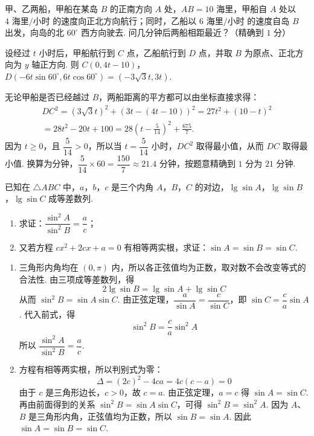 \begin{problem}
甲、乙两船，甲船在某岛 \(B\) 的正南方向 \(A\) 处，\(AB=10\text{ 海里}\)，甲船自 \(A\) 处以 \(4\text{ 海里/小时}\) 的速度向正北方向航行；同时，乙船以 \(6\text{ 海里/小时}\) 的速度自岛 \(B\) 出发，向岛的北 \(60^\circ\) 西方向驶去. 问几分钟后两船相距最近？（精确到 \(1\text{ 分}\)）
\end{problem}

\begin{solution}
设经过 \(t\) 小时后，甲船航行到 \(C\) 点，乙船航行到 \(D\) 点，并取 \(B\) 为原点、正北方向为 \(y\) 轴正方向. 则
\(C\left(0,4t-10\right)\)，\(D\left(-6t\sin60^\circ,6t\cos60^\circ\right)=\left(-3\sqrt3t,3t\right)\).


无论甲船是否已经越过 \(B\)，两船距离的平方都可以由坐标直接求得：
\[
\begin{gathered}
DC^2=\left(3\sqrt3t\right)^2+\left(3t-(4t-10)\right)^2
=27t^2+(10-t)^2\\
=28t^2-20t+100
=28\left(t-\frac5{14}\right)^2+\frac{675}{7}.
\end{gathered}
\]
因为 \(t\geq0\)，且 \(\dfrac5{14}>0\)，所以当 \(t=\dfrac5{14}\) 小时，\(DC^2\) 取得最小值，从而 \(DC\) 取得最小值. 换算为分钟，\(\dfrac5{14}\times60=\dfrac{150}{7}\approx21.4\) 分钟，按题意精确到 \(1\) 分为 \(21\) 分钟.
\end{solution}

\begin{problem}
已知在 \(\triangle ABC\) 中，\(a\)，\(b\)，\(c\) 是三个内角 \(A\)，\(B\)，\(C\) 的对边，\(\lg\sin A\)，\(\lg\sin B\)，\(\lg\sin C\) 成等差数列.
\begin{enumerate}
\item 求证：\(\dfrac{\sin^2 A}{\sin^2 B}=\dfrac{a}{c}\)；

\item 又若方程 \(cx^2+2cx+a=0\) 有相等两实根，求证：\(\sin A=\sin B=\sin C\).
\end{enumerate}
\end{problem}

\begin{solution}
\begin{enumerate}
\item 三角形内角均在 \(\left(0,\pi\right)\) 内，所以各正弦值均为正数，取对数不会改变等式的合法性. 由三项成等差数列，得
\[
2\lg\sin B=\lg\sin A+\lg\sin C
\]
从而 \(\sin^2B=\sin A\sin C\). 由正弦定理，\(\dfrac{a}{\sin A}=\dfrac{c}{\sin C}\)，即 \(\sin C=\dfrac{c}{a}\sin A\). 代入前式，得
\[
\sin^2B=\frac{c}{a}\sin^2A
\]
所以 \(\dfrac{\sin^2A}{\sin^2B}=\dfrac{a}{c}\).

\item 方程有相等两实根，所以判别式为零：
\[
\Delta=\left(2c\right)^2-4ca=4c\left(c-a\right)=0
\]
由于 \(c\) 是三角形边长，\(c>0\)，故 \(c=a\). 由正弦定理，\(a=c\) 得 \(\sin A=\sin C\). 再由前面得到的关系 \(\sin^2B=\sin A\sin C\)，可得 \(\sin^2B=\sin^2A\). 因为 \(A\)、\(B\) 是三角形内角，正弦值均为正数，所以 \(\sin B=\sin A\). 因此 \(\sin A=\sin B=\sin C\).
\end{enumerate}
\end{solution}

